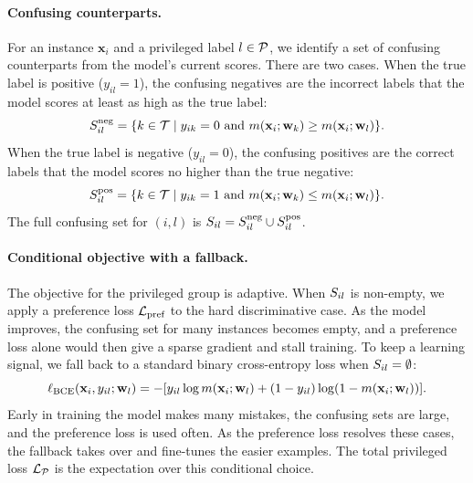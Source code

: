\paragraph{Confusing counterparts.}
For an instance $\mathbf{x}_i$ and a privileged label $l \in \mathcal{P}$, we
identify a set of confusing counterparts from the model's current scores. There are
two cases. When the true label is positive ($y_{il}=1$), the confusing negatives
are the incorrect labels that the model scores at least as high as the true label:
\begin{equation}
	S_{il}^{\text{neg}} = \{k \in \mathcal{T} \mid y_{ik}=0 \text{ and } m(\mathbf{x}_i; \mathbf{w}_k) \ge m(\mathbf{x}_i; \mathbf{w}_l) \}.
	\label{eq:fairpo-confusing-neg}
\end{equation}
When the true label is negative ($y_{il}=0$), the confusing positives are the
correct labels that the model scores no higher than the true negative:
\begin{equation}
	S_{il}^{\text{pos}} = \{k \in \mathcal{T} \mid y_{ik}=1 \text{ and } m(\mathbf{x}_i; \mathbf{w}_k) \le m(\mathbf{x}_i; \mathbf{w}_l) \}.
	\label{eq:fairpo-confusing-pos}
\end{equation}
The full confusing set for $(i, l)$ is $S_{il} = S_{il}^{\text{neg}} \cup S_{il}^{\text{pos}}$.

\paragraph{Conditional objective with a fallback.}
The objective for the privileged group is adaptive. When $S_{il}$ is non-empty,
we apply a preference loss $\mathcal{L}_{\text{pref}}$ to the hard discriminative case.
As the model improves, the confusing set for many instances becomes empty, and a
preference loss alone would then give a sparse gradient and stall training. To keep
a learning signal, we fall back to a standard binary cross-entropy loss when
$S_{il} = \emptyset$:
\begin{equation}
	\ell_{\text{BCE}}(\mathbf{x}_i, y_{il}; \mathbf{w}_l) = -[y_{il} \log m(\mathbf{x}_i; \mathbf{w}_l) + (1-y_{il}) \log(1-m(\mathbf{x}_i; \mathbf{w}_l))].
	\label{eq:fairpo-bce}
\end{equation}
Early in training the model makes many mistakes, the confusing sets are large, and
the preference loss is used often. As the preference loss resolves these cases, the
fallback takes over and fine-tunes the easier examples. The total privileged loss
$\mathcal{L}_{\mathcal{P}}$ is the expectation over this conditional choice.

